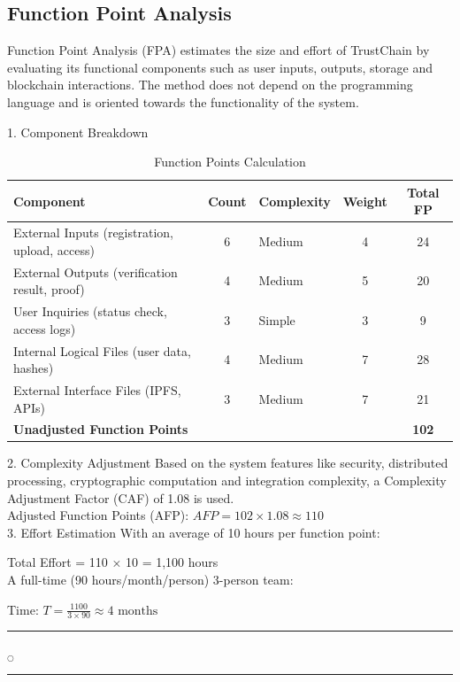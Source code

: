 \subsection{Function Point Analysis}
Function Point Analysis (FPA) estimates the size and effort of TrustChain by evaluating its functional components such as user inputs, outputs, storage and blockchain interactions. The method does not depend on the programming language and is oriented towards the functionality of the system.

1. Component Breakdown

\begin{table}[h!]
\centering
\begin{tabular}{|l|c|l|c|c|}
\hline
\textbf{Component}                                   & \textbf{Count} & \textbf{Complexity} & \textbf{Weight} & \textbf{Total FP} \\
\hline
External Inputs (registration, upload, access)              & 6     & Medium     & 4      & 24       \\
External Outputs (verification result, proof)          & 4     & Medium     & 5      & 20       \\
User Inquiries (status check, access logs)             & 3     & Simple     & 3      & 9       \\
Internal Logical Files (user data, hashes) & 4     & Medium     & 7      & 28       \\
External Interface Files (IPFS, APIs)             & 3     & Medium     & 7      & 21       \\
\hline
\textbf{Unadjusted Function Points}              &       &            &        & \textbf{102}  \\
\hline
\end{tabular}
\caption{Function Points Calculation}
\label{tab:function_points}
\end{table}

2. Complexity Adjustment
Based on the system features like security, distributed processing, cryptographic computation and integration complexity, a Complexity Adjustment Factor (CAF) of 1.08 is used.
\\
Adjusted Function Points (AFP): $AFP = 102 \times 1.08 \approx 110$\\

3. Effort Estimation
With an average of 10 hours per function point:

Total Effort = 110 × 10 = 1,100 hours\\

A full-time (90 hours/month/person) 3-person team:

Time: $T = \frac{1100}{3 \times 90} \approx 4 \text{ months}$

\rule{0.49\textwidth}{0.75pt} $_{\bigcirc}$ \rule{0.49\textwidth}{0.75pt}\\
